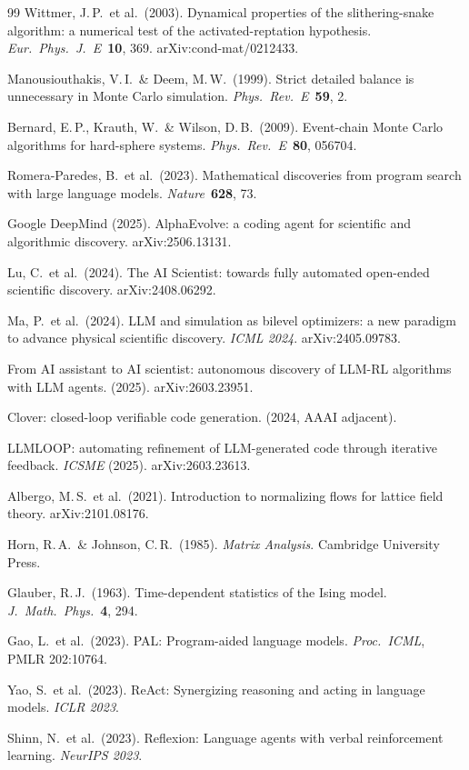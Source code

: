 \documentclass[10.5pt]{article}
\begin{document}
\begin{thebibliography}{99}
  Wittmer, J.\,P.\ et al.\ (2003).
  Dynamical properties of the slithering-snake algorithm: a numerical test
  of the activated-reptation hypothesis.
  \textit{Eur.\ Phys.\ J.\ E}\ \textbf{10}, 369.
  arXiv:cond-mat/0212433.

  Manousiouthakis, V.\,I.\ \& Deem, M.\,W.\ (1999).
  Strict detailed balance is unnecessary in Monte Carlo simulation.
  \textit{Phys.\ Rev.\ E}\ \textbf{59}, 2.

  Bernard, E.\,P., Krauth, W.\ \& Wilson, D.\,B.\ (2009).
  Event-chain Monte Carlo algorithms for hard-sphere systems.
  \textit{Phys.\ Rev.\ E}\ \textbf{80}, 056704.

  Romera-Paredes, B.\ et al.\ (2023).
  Mathematical discoveries from program search with large language models.
  \textit{Nature}\ \textbf{628}, 73.

  Google DeepMind (2025).
  AlphaEvolve: a coding agent for scientific and algorithmic discovery.
  arXiv:2506.13131.

  Lu, C.\ et al.\ (2024).
  The AI Scientist: towards fully automated open-ended scientific discovery.
  arXiv:2408.06292.

  Ma, P.\ et al.\ (2024).
  LLM and simulation as bilevel optimizers: a new paradigm to advance
  physical scientific discovery.
  \textit{ICML 2024}. arXiv:2405.09783.

  From AI assistant to AI scientist: autonomous discovery of LLM-RL
  algorithms with LLM agents. (2025). arXiv:2603.23951.

  Clover: closed-loop verifiable code generation. (2024, AAAI adjacent).

  LLMLOOP: automating refinement of LLM-generated code through iterative
  feedback. \textit{ICSME} (2025). arXiv:2603.23613.

  Albergo, M.\,S.\ et al.\ (2021).
  Introduction to normalizing flows for lattice field theory.
  arXiv:2101.08176.

  Horn, R.\,A.\ \& Johnson, C.\,R.\ (1985).
  \textit{Matrix Analysis}.  Cambridge University Press.

  Glauber, R.\,J.\ (1963).
  Time-dependent statistics of the Ising model.
  \textit{J.\ Math.\ Phys.}\ \textbf{4}, 294.

  Gao, L.\ et al.\ (2023).
  PAL: Program-aided language models.
  \textit{Proc.\ ICML}, PMLR 202:10764.

  Yao, S.\ et al.\ (2023).
  ReAct: Synergizing reasoning and acting in language models.
  \textit{ICLR 2023}.

  Shinn, N.\ et al.\ (2023).
  Reflexion: Language agents with verbal reinforcement learning.
  \textit{NeurIPS 2023}.

\end{thebibliography}
\end{document}
